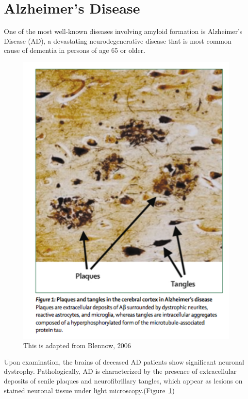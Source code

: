 \section{Alzheimer's Disease}
One of the most well-known diseases involving amyloid formation is Alzheimer's Disease (AD), a devastating neurodegenerative disease that is most common cause of dementia in persons of age 65 or older.

\begin{figure}
  \centering
  \includegraphics[width=6in]{figures/introduction/AD_tissue_pathology.pdf}
  \caption[Image of lesions formed by plaques and NFTs on brain tissue]{This is adapted from Blennow, 2006}
  \label{fig:AD_tissue_pathology}
\end{figure}

Upon examination, the brains of deceased AD patients show significant neuronal dystrophy.  Pathologically, AD is characterized by the presence of extracellular deposits of senile plaques and neurofibrillary tangles, which appear as lesions on stained neuronal tissue under light microscopy.(Figure~\ref{fig:AD_tissue_pathology})

